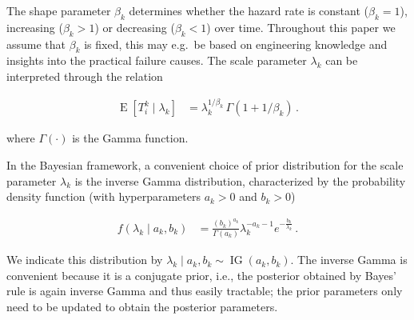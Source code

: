 \documentclass[Journal,letterpaper]{ascelike-new}
\newcommand{\E}{\operatorname{E}}
\newcommand{\ig}{\operatorname{IG}}   %
\begin{document}
The shape parameter $\beta_k$ determines whether the hazard rate is constant ($\beta_k=1$), increasing ($\beta_k > 1$)
or decreasing ($\beta_k < 1$) over time. Throughout this paper we assume that $\beta_k$ is fixed, this may e.g.\ be
based on engineering knowledge and insights into the practical failure causes.
The scale parameter $\lambda_k$ can be interpreted through the relation
\begin{linenomath*}
\begin{align}
\E[T_i^k \mid \lambda_k] &= \lambda_k^{1/\beta_k}\, \Gamma(1 + 1/\beta_k)\,.
\label{eq:lambdainterpret}
\end{align}
\end{linenomath*}
where $\Gamma(\cdot)$ is the Gamma function.


In the Bayesian framework, a convenient choice of prior distribution for the scale parameter $\lambda_k$
is the inverse Gamma distribution, characterized by the probability density function (with hyperparameters 
$a_k > 0$ and $b_k > 0$)
\begin{linenomath*}
\begin{align}
f(\lambda_k\mid a_k,b_k) &= \frac{(b_k)^{a_k}}{\Gamma(a_k)} \lambda_k^{-a_k -1} e^{-\frac{b_k}{\lambda_k}}\,.
\label{eq:ig-def}
\end{align}
\end{linenomath*}
We indicate this distribution by $\lambda_k \mid a_k, b_k \sim \ig(a_k,b_k)$.
The inverse Gamma is convenient because it is a conjugate prior,
i.e., the posterior obtained by Bayes' rule is again inverse Gamma and thus easily tractable;
the prior parameters only need to be updated to obtain the posterior parameters.
\end{document}
